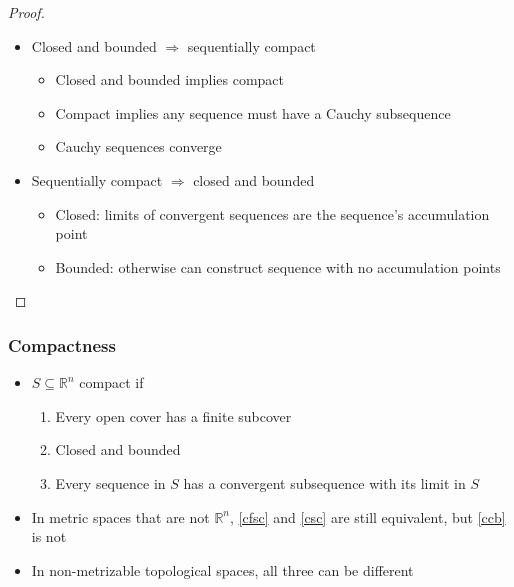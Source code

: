 \documentclass[compress]{beamer}
\def\R{\mathbb{R}}
\begin{document}
\begin{frame}
  \begin{proof}
    \begin{itemize}
    \item Closed and bounded $\Rightarrow$ sequentially compact
      \begin{itemize}
      \item Closed and bounded implies compact
      \item Compact implies any sequence must have a Cauchy subsequence 
      \item Cauchy sequences converge
      \end{itemize}
    \item Sequentially compact $\Rightarrow$ closed and bounded
      \begin{itemize}
      \item Closed: limits of convergent sequences are the sequence's
        accumulation point
      \item Bounded: otherwise can construct sequence with no
        accumulation points
      \end{itemize}
    \end{itemize}
  \end{proof}
\end{frame}

\begin{frame}
  \frametitle{Compactness}
  \begin{itemize}
  \item $S \subseteq \R^n$ compact if 
    \begin{enumerate}
    \item\label{cfsc} Every open cover has a finite subcover
    \item\label{ccb} Closed and bounded
    \item\label{csc} Every sequence in $S$ has a convergent subsequence with
      its limit in $S$
    \end{enumerate}
  \item In metric spaces that are not $\R^n$, \ref{cfsc} and \ref{csc}
    are still equivalent, but \ref{ccb} is not
  \item In non-metrizable topological spaces, all three can be
    different 
  \end{itemize}
\end{frame}
\end{document}

